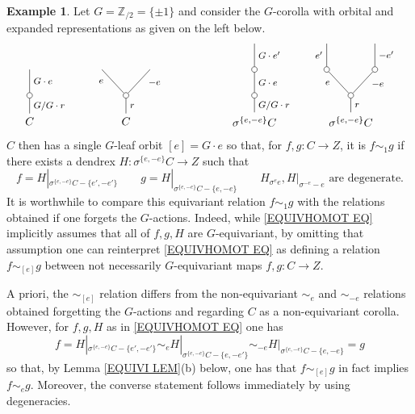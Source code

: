 \documentclass[a4paper,10pt
,draft
]{article}%
\numberwithin{equation}{section}
\numberwithin{figure}{section}
\theoremstyle{definition} %
\newtheorem{example}[equation]{Example}%
\newcommand{\1}{\ensuremath{\mathbbm 1}}%
\begin{document}
\begin{example}\label{EQUIVSIM EX}
	Let $G = \mathbb{Z}_{/2} = \{\pm 1\}$
	and consider the $G$-corolla with orbital and expanded representations as given on the left below.
\[
\begin{tikzpicture}
[grow=up,auto,level distance=2.3em,every node/.style = {font=\footnotesize},dummy/.style={circle,draw,inner sep=0pt,minimum size=1.75mm}]
	\node at (0,0) [font=\normalsize]{$C$}
		child{node [dummy] {}
			child{
			edge from parent node [swap] {$G \cdot e$}
node [name=Kone,swap] {}}
		edge from parent node [swap] {$G/G \cdot r$}
		};
	\node at (3,0) [font=\normalsize]{$C$}
		child{node [dummy] {}
			child{
			edge from parent node [swap,near end] {$-e$} node [name=Kn] {}}
			child{
			edge from parent node [near end] {$e$}
node [name=Kone,swap] {}}
		edge from parent node [swap] {$r$}
		};
	\node at (7,0) [font=\normalsize]{$\sigma^{\{e,-e\}} C$}
		child{node [dummy] {}
			child{node [dummy] {}
				child{
				edge from parent node [swap] {$G \cdot e'$}
node [swap] {}}
			edge from parent node [swap] {$G \cdot e$}
node [swap] {}}
		edge from parent node [swap] {$G/G \cdot r$}
		};
	\node at (10,0) [font=\normalsize]{$\sigma^{\{e,-e\}} C$}
		child{node [dummy] {}
			child{node [dummy] {}
				child{
				edge from parent node [swap] {$-e'$} node {}}
			edge from parent node [swap,near end] {$-e$} node {}}
			child{node [dummy] {}
				child{
				edge from parent node {$e'$}
node [swap] {}}
			edge from parent node [near end] {$e$}
node [swap] {}}
		edge from parent node [swap] {$r$}
		};
\end{tikzpicture}
\]
$C$ then has a single $G$-leaf orbit $[e] = G \cdot e$ so that,
for $f,g \colon C \to Z$,
it is $f \sim_1 g$ if there exists a dendrex
$H \colon \sigma^{\{e,-e\}}C \to Z$
such that 
\begin{equation}\label{EQUIVHOMOT EQ}
	f = H|_{\sigma^{\{e,-e\}}C - \{e',-e'\}}
\qquad
	g = H|_{\sigma^{\{e,-e\}}C - \{e,-e\}}
\qquad
	H_{\sigma^e e}, H|_{\sigma^{-e}-e} \text{ are degenerate}.
\end{equation}
It is worthwhile to compare this equivariant relation 
$f \sim_1 g$
with the relations obtained if one forgets the $G$-actions. Indeed, while \eqref{EQUIVHOMOT EQ} implicitly assumes that all of $f,g,H$ are $G$-equivariant,
by omitting that assumption one can reinterpret 
\eqref{EQUIVHOMOT EQ}
as defining a relation
$f \sim_{[e]} g$ between not necessarily $G$-equivariant maps $f,g \colon C \to Z$.

A priori, the $\sim_{[e]}$ relation differs from the 
non-equivariant 
$\sim_{e}$ and $\sim_{-e}$
relations obtained forgetting the $G$-actions
and regarding $C$ as a non-equivariant corolla.
However, for $f,g,H$ as in \eqref{EQUIVHOMOT EQ} one has
\begin{equation}\label{EQUIVSIM EQ}
f = H|_{\sigma^{\{e,-e\}}C - \{e',-e'\}}
\sim_e H|_{\sigma^{\{e,-e\}}C - \{e,-e'\}}
\sim_{-e} H|_{\sigma^{\{e,-e\}}C - \{e,-e\}} =g
\end{equation}
so that, by Lemma \ref{EQUIVI LEM}(b) below,
one has that $f \sim_{[e]} g$ in fact implies $f \sim_{e} g$. 
Moreover, the converse statement follows immediately by using degeneracies.


\end{example}
\end{document}
